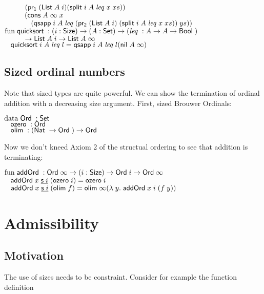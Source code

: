 \begin{bsp}
$\spcx	(\pra (\List A\; i) (\pivot i\; A\; \lleq x\; xs))$\\
$\spcx	(\cons A\; \infty \; x\; $\\
$\spcx	\spc   (\qsapp i\; A\; \lleq (\prb (\List A\; i) \; (\pivot i\; A\; \lleq x\; xs))\; ys))$\\
$\mathrm{fun}\; \mathsf{quicksort}\; : (i : \mathsf{Size} ) \rightarrow (A : \mathsf{Set} ) \rightarrow (\mathit{leq}\; : A \rightarrow A \rightarrow \mathsf{Bool}\;)$\\ 
$\spcx	\ra \List A\; i \ra \List A\; \infty$\\
$\hspace*{3mm} \mathsf{quicksort}\; i\; A\; \mathit{leq}\; l = \mathsf{qsapp}\; i\; A\; \mathit{leq}\; l (\mathsf{nil}\; A\; \infty)$ 
\end{bsp}

\subsection{Sized ordinal numbers}
Note that sized types are quite powerful. 
We can show the termination of ordinal addition with a decreasing size argument.
First, sized Brouwer Ordinals:
\begin{bsp}
$\mathrm{data}\; \mathsf{Ord}\; : \mathsf{Set}$ \\
$\hspace*{3mm} \mathsf{ozero}\; : \mathsf{Ord}\; $\\
$\hspace*{3mm} \mathsf{olim}\; : (\mathsf{Nat}\; \rightarrow \mathsf{Ord}\; ) \rightarrow \mathsf{Ord}\; $
\end{bsp}
Now we don't kneed Axiom 2 of the structual ordering to see that addition is terminating:
\begin{bsp}
$\mathrm{fun}\; \mathsf{addOrd}\; : \mathsf{Ord}\; \infty \rightarrow ( i : \mathsf{Size} ) \rightarrow{\mathsf{Ord}\;i \rightarrow\mathsf{Ord}\;\infty }$\\
$\hspace*{3mm} \mathsf{addOrd}\; x\; \underline{\mathsf{s}\; i}\; (\mathsf{ozero}\; i) = \mathsf{ozero}\; i $\\
$\hspace*{3mm} \mathsf{addOrd}\; x\; \underline{\mathsf{s}\; i}\; (\mathsf{olim}\; f)  = \mathsf{olim}\; \infty ( \lambda\; y .\; \mathsf{addOrd}\;  x \; i \; (f \; y))  $
\end{bsp}

\section{Admissibility}
\subsection{Motivation}
The use of sizes needs to be constraint.
Consider for example the function definition

